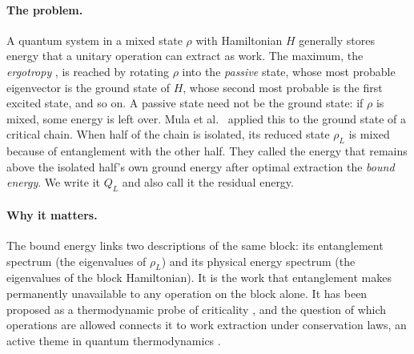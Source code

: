 \documentclass[11pt,a4paper]{article}
\theoremstyle{remark}
\begin{document}
\paragraph{The problem.} A quantum system in a mixed state $\rho$ with Hamiltonian $H$ generally stores energy that a unitary operation can extract as work. The maximum, the \emph{ergotropy} \cite{allahverdyan}, is reached by rotating $\rho$ into the \emph{passive} state, whose most probable eigenvector is the ground state of $H$, whose second most probable is the first excited state, and so on. A passive state need not be the ground state: if $\rho$ is mixed, some energy is left over. Mula et al.\ \cite{mula} applied this to the ground state of a critical chain. When half of the chain is isolated, its reduced state $\rho_L$ is mixed because of entanglement with the other half. They called the energy that remains above the isolated half's own ground energy after optimal extraction the \emph{bound energy}. We write it $Q_L$ and also call it the residual energy.

\paragraph{Why it matters.} The bound energy links two descriptions of the same block: its entanglement spectrum (the eigenvalues of $\rho_L$) and its physical energy spectrum (the eigenvalues of the block Hamiltonian). It is the work that entanglement makes permanently unavailable to any operation on the block alone. It has been proposed as a thermodynamic probe of criticality \cite{mula,mitra}, and the question of which operations are allowed connects it to work extraction under conservation laws, an active theme in quantum thermodynamics \cite{mitsu,onuma}.
\end{document}
